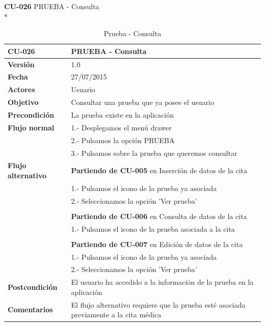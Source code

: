 \documentclass[../pfc.tex]{subfiles}
\begin{document}
	\clearpage
	
	\textbf{CU-026}	PRUEBA - Consulta\\*
	
	\begin{table}[H]
		\centering
		\begin{tabular}[t]{|p{3cm}|p{9.5cm}|}
			\hline \textbf{CU-026} & \textbf{PRUEBA - Consulta} \\*
			\hline\hline \textbf{Versión} & 1.0 \\*
			\hline\hline \textbf{Fecha} & 27/07/2015 \\*
			\hline\textbf{Actores} 	& Usuario\\*
			\hline \textbf{Objetivo} & Consultar una prueba que ya posee el usuario\\* 			
			\hline \textbf{Precondición} & La prueba existe en la aplicación\\* 
			\hline \textbf{Flujo normal} & 1.- Desplegamos el menú drawer \\* 
			& 2.- Pulsamos la opción PRUEBA\\*	
			& 3.- Pulsamos sobre la prueba que queremos consultar\\*	
			\hline \textbf{Flujo alternativo} & \textbf{Partiendo de CU-005} en Inserción de datos de la cita\\* 
			& 1.- Pulsamos el icono de la prueba ya asociada\\*	
			& 2.- Seleccionamos la opción 'Ver prueba'\\*
			& \\*
			& \textbf{Partiendo de CU-006} en Consulta de datos de la cita\\* 
			& 1.- Pulsamos el icono de la prueba asociada a la cita\\*	
			& \\*
			& \textbf{Partiendo de CU-007} en Edición de datos de la cita\\* 
			& 1.- Pulsamos el icono de la prueba ya asociada\\*	
			& 2.- Seleccionamos la opción 'Ver prueba'\\*
			\hline \textbf{Postcondición} & El usuario ha accedido a la información de la prueba en la aplicación \\* 
			\hline \textbf{Comentarios}   & El flujo alternativo requiere que la prueba esté asociada previamente a la cita médica\\*
			\hline
		\end{tabular}
		\caption{Prueba - Consulta}
		\label{tabla:caso026}
	\end{table}
	
\end{document}
